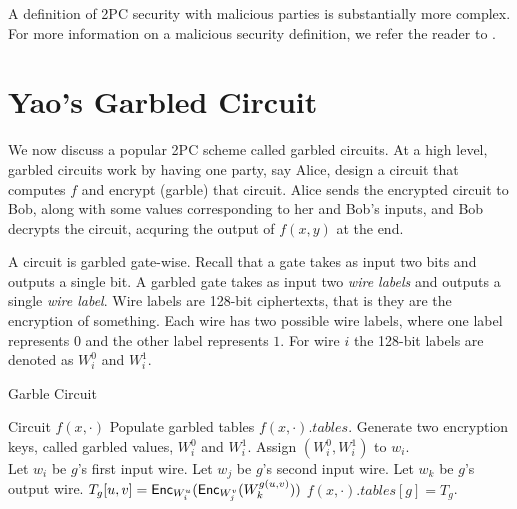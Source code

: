 A definition of 2PC security with malicious parties is substantially more complex.
For more information on a malicious security definition, we refer the reader to \cite{lindell2009}.

\section{Yao's Garbled Circuit}
We now discuss a popular 2PC scheme called garbled circuits.
At a high level, garbled circuits work by having one party, say Alice, design a circuit that computes $f$ and encrypt (garble) that circuit.
Alice sends the encrypted circuit to Bob, along with some values corresponding to her and Bob's inputs, and Bob decrypts the circuit, acquring the output of $f(x,y)$ at the end.

A circuit is garbled gate-wise.
Recall that a gate takes as input two bits and outputs a single bit. 
A garbled gate takes as input two \textit{wire labels} and outputs a single \textit{wire label}.
Wire labels are 128-bit ciphertexts, that is they are the encryption of something.
Each wire has two possible wire labels, where one label represents $0$ and the other label represents $1$.
For wire $i$ the 128-bit labels are denoted as $W_i^0$ and $W_i^1$. 


\begin{algorithm}
\caption{Garble Circuit}
\label{alg:garble}
\begin{algorithmic}
    \Require Circuit $f(x,\cdot)$ 
    \Ensure Populate garbled tables $f(x,\cdot).tables$.
    \State Generate two encryption keys, called garbled values, $W_i^0$ and $W_i^1$.
    \State Assign $(W_i^0, W_i^1)$ to $w_i$.
\EndFor \\

    \State Let $w_i$ be $g$'s first input wire.
    \State Let $w_j$ be $g$'s second input wire.
    \State Let $w_k$ be $g$'s output wire.
    \State $T_g[u,v] = \textsf{Enc}_{W_i^u}( \textsf{Enc}_{W_j^v} ( W_k^{g(u,v)}))$
    \EndFor
    \State $f(x,\cdot).tables[g] = T_g$.
\EndFor
\end{algorithmic}
\end{algorithm}

